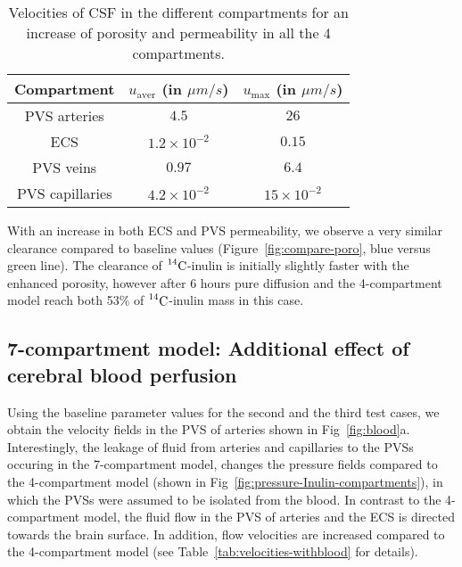 \documentclass[10pt]{article}
\newcommand{\1}{^{(1)}}
\newcommand{\2}{^{(2)}}
\newcommand{\Cinulin}{$\prescript{14}{}{\text{C}}$-inulin }
\begin{document}
\begin{table}[h!]
    \centering
    \begin{tabular}{c|c|c}
       Compartment & $u_\text{aver}$ (in $\si{\mu m/s}$) & $u_\text{max}$ (in $\si{\mu m/s}$) \\
       \hline

        PVS arteries & $4.5$ & $26$ \\
        ECS &  $1.2 \times 10^{-2}$ & $0.15 $ \\
        PVS veins & $0.97$ & $6.4$ \\
        PVS capillaries & $4.2\times 10^{-2}$ & $15 \times 10^{-2}$
    \end{tabular}
    \caption{Velocities of CSF in the different compartments for an increase of porosity and permeability in all the 4 compartments.}
    \label{tab:velocities-enhanced}
\end{table}
With an increase in both ECS and PVS permeability, we observe a very similar clearance compared to baseline values (Figure~\ref{fig:compare-poro}, blue versus green line). The clearance of \Cinulin is initially slightly faster with the enhanced porosity, however after 6 hours pure diffusion and the 4-compartment model reach both 53\% of \Cinulin mass in this case. 


\subsection{7-compartment model: Additional effect of cerebral blood perfusion}
Using the baseline parameter values for the second and the third test cases, we obtain the velocity fields in the PVS of arteries shown in Fig~\ref{fig:blood}a. Interestingly, the leakage of fluid from arteries and capillaries  to the PVSs  occuring in the 7-compartment model, changes the pressure fields compared to the 4-compartment model (shown in Fig~\ref{fig:pressure-Inulin-compartments}), in which the PVSs were assumed to be isolated from the blood. In contrast to the 4-compartment model, the fluid flow in the PVS of arteries and the ECS is directed towards the brain surface. In addition, flow velocities are increased compared to the 4-compartment model (see Table~\ref{tab:velocities-withblood} for details). 
\end{document}

